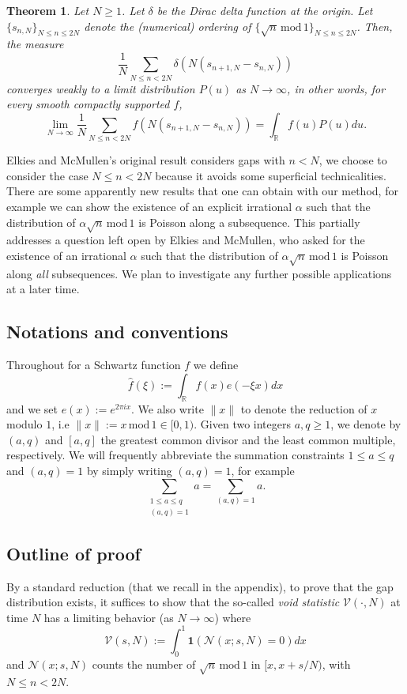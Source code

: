 \documentclass[12pt,reqno]{amsart}
\theoremstyle{plain}
\newtheorem{theorem}{Theorem}
\numberwithin{equation}{section}
\numberwithin{figure}{section}
\theoremstyle{plain}
\theoremstyle{definition}
\theoremstyle{remark}
\newcommand{\mmod}{\,\mathrm{mod}\,}
\begin{document}
\begin{theorem} \label{thm:elkiesmcmullen}
  Let $N \geq 1$.
  Let $\delta$ be the Dirac delta function 
  at the origin. Let $\{s_{n, N}\}_{N \leq n \leq 2N}$ 
  denote the (numerical) ordering of 
  $\{ \sqrt{n} \mmod 1 \}_{N \leq n \leq 2N}$. Then, the measure
  $$
  \frac{1}{N} \sum_{N \leq n < 2N} 
  \delta ( N (s_{n + 1, N} - s_{n,N}))
  $$
  converges weakly to a limit distribution $P(u)$ as $N \rightarrow \infty$, in other words, for every smooth compactly supported $f$, 
  $$
 \lim_{N \rightarrow \infty} \frac{1}{N} \sum_{N \leq n < 2N} 
 f ( N (s_{n + 1, N} - s_{n, N}) ) 
 = \int_{\mathbb{R}} f(u) P(u) du .
  $$
\end{theorem}
Elkies and McMullen's original result considers gaps with $n < N$, we choose to consider the case $N \leq n < 2N$ because it avoids some superficial technicalities.
There are some apparently new results that one can obtain with our method, for example we can show the existence
of an explicit irrational $\alpha$ such that the distribution of $\alpha \sqrt{n} \mmod{1}$ is Poisson along a subsequence. This partially addresses a question left open by Elkies and McMullen, who asked for the existence of an irrational $\alpha$ such that the distribution of $\alpha \sqrt{n} \mmod{1}$ is Poisson along \textit{all} subsequences.  We plan to investigate any further possible applications at a later time. %


\subsection{Notations and conventions}
Throughout for a Schwartz function $f$ we define
$$
\widehat{f}(\xi) := \int_{\mathbb{R}} f(x) e( - \xi x) dx
$$
and we set $e(x) := e^{2\pi i x}$. 
We also write $\| x \|$ to denote the reduction of $x$ modulo $1$, i.e $\|x \| := x \mmod{1} \in [0,1)$.
Given two integers $a,q\geq 1$,
we denote by $(a,q)$ and $[a,q]$ the greatest common
divisor and the least common multiple, respectively. 
We will frequently abbreviate the summation constraints 
$1\leq a \leq q$ and $ (a,q)=1$ by simply writing $(a,q)=1$,
for example
$$
\sum_{\substack{1\leq a \leq q \\ (a,q)=1}} a 
=\sum_{(a,q)=1} a.
$$

\subsection{Outline of proof}

By a standard reduction (that we recall in the appendix), 
to prove that the gap distribution exists, 
it suffices to show that the so-called 
\textit{void statistic} $\mathcal{V}(\cdot,N)$ 
at time $N$ has a limiting behavior (as $N\rightarrow \infty$) 
where
$$
\mathcal{V}(s,N)
:= \int_{0}^{1} \mathbf{1} 
  (\mathcal{N}(x; s, N) = 0 ) dx
$$
 and $\mathcal{N}(x; s, N)$ counts the number of 
  $ \sqrt{n} \mmod 1$ in $[x, x + s / N)$, with $N \leq n < 2N$.
\end{document}
